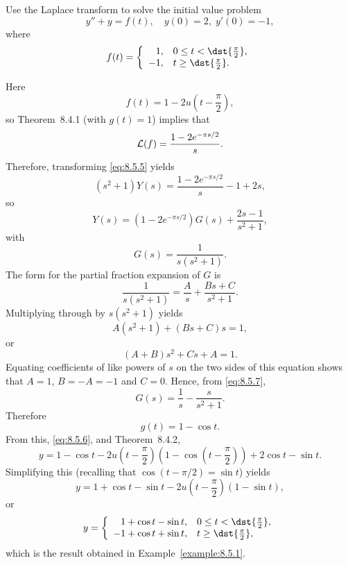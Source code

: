 \setcounter{example}{1}
\setcounter{equation}{4}
\begin{example}
  \label{example:8.5.2}\rm \space Use the Laplace transform to solve the initial value problem
  \begin{equation}
    \label{eq:8.5.5}y''+y=f(t),\quad y(0)=2,\;y'(0)=-1,
  \end{equation}
  where
  \[
    f(t)=\left\{
    \begin{array}{cl}
      \phantom{-}1, & 0\le t<\dst{\frac{\pi}{2}}, \\
      -1,           & t\ge\dst{\frac{\pi}{2}}.
    \end{array}\right.
  \]
\end{example}
\setcounter{equation}{5}
\begin{examplesolution}
\solution Here
\[
  f(t)=1-2u\left(t-\frac{\pi}{2}\right),
\]
so Theorem~8.4.1 (with $g(t)=1$) implies that
\[
  {\cal L}(f)=\frac{1-2e^{-{\pi s/2}}}{s}.
\]
Therefore, transforming \eqref{eq:8.5.5} yields
\[
  (s^{2}+1)Y(s)=\frac{1-2e^{-{\pi s/2}}}{s}-1+2s,
\]
so
\begin{equation}
  \label{eq:8.5.6}Y(s)=(1-2e^{-{\pi s/2}})G(s)+\frac{2s-1}{s^{2}+1},
\end{equation}
with
\[
  G(s)=\frac{1}{s(s^{2}+1)}.
\]
The form for the partial fraction expansion of $G$ is
\begin{equation}
  \label{eq:8.5.7}\frac{1}{s(s^{2}+1)}=\frac{A}{s}+\frac{Bs+C}{s^{2}+1}.
\end{equation}
Multiplying through by $s(s^{2}+1)$ yields
\[
  A(s^{2}+1)+(Bs+C)s=1,
\]
or
\[
  (A+B)s^{2}+Cs+A=1.
\]
Equating coefficients of like powers of $s$ on the two sides of this equation shows that $A=1$,
$B=-A=-1$ and $C=0$. Hence, from \eqref{eq:8.5.7},
\[
  G(s)=\frac{1}{s}-\frac{s}{s^{2}+1}.
\]
Therefore
\[
  g(t)=1-\cos t.
\]
From this, \eqref{eq:8.5.6}, and Theorem~8.4.2,
\[
  y=1-\cos t-2u\left(t-\frac{\pi}{2}\right)\left(1-\cos\left(t-\frac{\pi}{2}\right)\right)+2\cos t-\sin t.
\]
Simplifying this (recalling that $\cos(t-\pi/2)=\sin t$) yields
\[
  y=1+\cos t-\sin t-2u\left(t-\frac{\pi}{2}\right)(1-\sin t),
\]
or
\[
  y=\left\{
  \begin{array}{cl}
    \phantom{-}1+\cos t-\sin t, & 0\le t<\dst{\frac{\pi}{2}}, \\
    -1+\cos t+\sin t,           & t\ge\dst{\frac{\pi}{2}},
  \end{array}\right.
\]
which is the result obtained in Example~\ref{example:8.5.1}.
\end{examplesolution}

